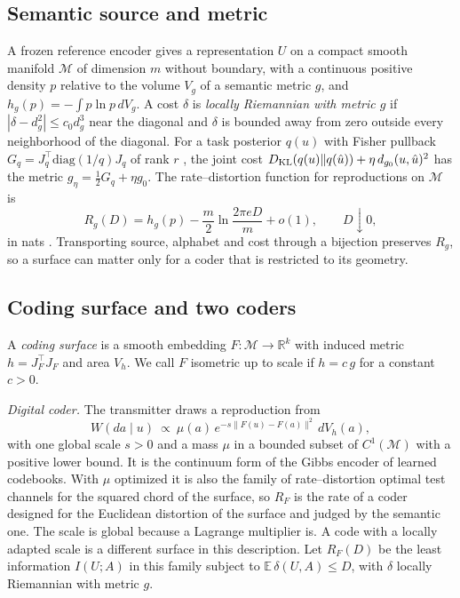 \documentclass[journal]{IEEEtran}
\newcommand{\E}{\mathbb E}
\newcommand{\M}{\mathcal M}
\begin{document}
\subsection{Semantic source and metric}
A frozen reference encoder gives a representation $U$ on a compact smooth manifold $\M$ of dimension $m$ without boundary, with a continuous positive density $p$ relative to the volume $V_g$ of a semantic metric $g$, and $h_g(p)=-\int p\ln p\,dV_g$. A cost $\delta$ is \emph{locally Riemannian with metric $g$} if $|\delta-d_g^2|\le c_0d_g^3$ near the diagonal and $\delta$ is bounded away from zero outside every neighborhood of the diagonal. For a task posterior $q(u)$ with Fisher pullback $G_q=J_q^\top\mathrm{diag}(1/q)J_q$ of rank $r$ \cite{arvanitidis2022pullinginformationgeometry}, the joint cost $D_{\rm KL}(q(u)\Vert q(\hat u))+\eta\,d_{g_0}(u,\hat u)^2$ has the metric $g_\eta=\tfrac12G_q+\eta g_0$. The rate--distortion function for reproductions on $\M$ is
\begin{equation}
 R_g(D)=h_g(p)-\frac m2\ln\frac{2\pi eD}{m}+o(1),\qquad D\downarrow0, \label{eq:rg}
\end{equation}
in nats \cite{linder1999high}. Transporting source, alphabet and cost through a bijection preserves $R_g$, so a surface can matter only for a coder that is restricted to its geometry.

\subsection{Coding surface and two coders}
A \emph{coding surface} is a smooth embedding $F:\M\to\mathbb R^k$ with induced metric $h=J_F^\top J_F$ and area $V_h$. We call $F$ isometric up to scale if $h=c\,g$ for a constant $c>0$.

\emph{Digital coder.} The transmitter draws a reproduction from
\begin{equation}
 W(da\mid u)\ \propto\ \mu(a)\,e^{-s\|F(u)-F(a)\|^2}\,dV_h(a), \label{eq:kernelc}
\end{equation}
with one global scale $s>0$ and a mass $\mu$ in a bounded subset of $C^1(\M)$ with a positive lower bound. It is the continuum form of the Gibbs encoder of learned codebooks. With $\mu$ optimized it is also the family of rate--distortion optimal test channels for the squared chord of the surface, so $R_F$ is the rate of a coder designed for the Euclidean distortion of the surface and judged by the semantic one. The scale is global because a Lagrange multiplier is. A code with a locally adapted scale is a different surface in this description. Let $R_F(D)$ be the least information $I(U;A)$ in this family subject to $\E\,\delta(U,A)\le D$, with $\delta$ locally Riemannian with metric $g$.
\end{document}

